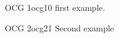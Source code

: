 \documentclass{article}
\begin{document}
\begin{ocg}{OCG 1}{ocg1}{0}
first example.
\end{ocg}

\begin{ocg}{OCG 2}{ocg2}{1}
Second example
\end{ocg}




\end{document}
